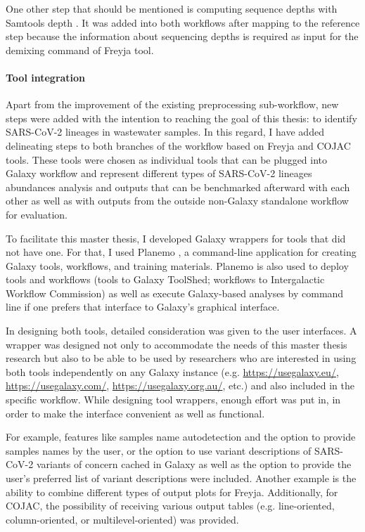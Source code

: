             One other step that should be mentioned is computing sequence depths with Samtools depth \cite{li2009}. It was added into both workflows after mapping to the reference step because the information about sequencing depths is required as input for the demixing command of Freyja tool.
            
            \paragraph{Tool integration} \label{sec:methods:changes:wrappers}
            Apart from the improvement of the existing preprocessing sub-workflow, new steps were added with the intention to reaching the goal of this thesis: to identify SARS-CoV-2 lineages in wastewater samples. In this regard, I have added delineating steps to both branches of the workflow based on Freyja and COJAC tools. These tools were chosen as individual tools that can be plugged into Galaxy workflow and represent different types of SARS-CoV-2 lineages abundances analysis and outputs that can be benchmarked afterward with each other as well as with outputs from the outside non-Galaxy standalone workflow for evaluation.

            To facilitate this master thesis, I developed Galaxy wrappers for tools that did not have one.  For that, I used Planemo \cite{planemo}, a command-line application for creating Galaxy tools, workflows, and training materials. Planemo is also used to deploy tools and workflows (tools to Galaxy ToolShed; workflows to Intergalactic Workflow Commission) as well as execute Galaxy-based analyses by command line if one prefers that interface to Galaxy's graphical interface.
            
            In designing both tools, detailed consideration was given to the user interfaces. A wrapper was designed not only to accommodate the needs of this master thesis research but also to be able to be used by researchers who are interested in using both tools independently on any Galaxy instance (e.g. \url{https://usegalaxy.eu/}, \url{https://usegalaxy.com/}, \url{https://usegalaxy.org.au/}, etc.) and also included in the specific workflow. While designing tool wrappers, enough effort was put in, in order to make the interface convenient as well as functional.
            
            For example, features like samples name autodetection and the option to provide samples names by the user, or the option to use variant descriptions of SARS-CoV-2 variants of concern cached in Galaxy as well as the option to provide the user's preferred list of variant descriptions were included. Another example is the ability to combine different types of output plots for Freyja. Additionally, for COJAC, the possibility of receiving various output tables (e.g. line-oriented, column-oriented, or multilevel-oriented) was provided. 
            
